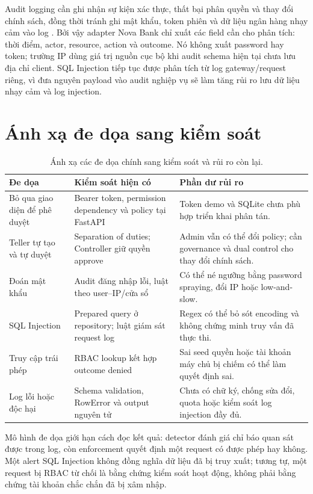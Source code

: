 Audit logging cần ghi nhận sự kiện xác thực, thất bại phân quyền và thay đổi
chính sách, đồng thời tránh ghi mật khẩu, token phiên và dữ liệu ngân hàng nhạy
cảm vào log \citep{OWASPLogging}. Bởi vậy adapter Nova Bank chỉ xuất các field
cần cho phân tích: thời điểm, actor, resource, action và outcome. Nó không xuất
password hay token; trường IP dùng giá trị nguồn cục bộ khi audit schema hiện
tại chưa lưu địa chỉ client. SQL Injection tiếp tục được phân tích từ log
gateway/request riêng, vì đưa nguyên payload vào audit nghiệp vụ sẽ làm tăng
rủi ro lưu dữ liệu nhạy cảm và log injection.

\section{Ánh xạ đe dọa sang kiểm soát}

\begin{table}[htbp]
\centering
\small
\begin{tabularx}{\textwidth}{p{}p{}X}
\toprule
Đe dọa & Kiểm soát hiện có & Phần dư rủi ro \\
\midrule
Bỏ qua giao diện để phê duyệt & Bearer token, permission dependency và policy tại FastAPI & Token demo và SQLite chưa phù hợp triển khai phân tán. \\
Teller tự tạo và tự duyệt & Separation of duties; Controller giữ quyền approve & Admin vẫn có thể đổi policy; cần governance và dual control cho thay đổi chính sách. \\
Đoán mật khẩu & Audit đăng nhập lỗi, luật theo user--IP/cửa sổ & Có thể né ngưỡng bằng password spraying, đổi IP hoặc low-and-slow. \\
SQL Injection & Prepared query ở repository; luật giám sát request log & Regex có thể bỏ sót encoding và không chứng minh truy vấn đã thực thi. \\
Truy cập trái phép & RBAC lookup kết hợp outcome denied & Sai seed quyền hoặc tài khoản máy chủ bị chiếm có thể làm quyết định sai. \\
Log lỗi hoặc độc hại & Schema validation, RowError và output nguyên tử & Chưa có chữ ký, chống sửa đổi, quota hoặc kiểm soát log injection đầy đủ. \\
\bottomrule
\end{tabularx}
\caption{Ánh xạ các đe dọa chính sang kiểm soát và rủi ro còn lại.}
\label{tab:threat-controls}
\end{table}

Mô hình đe dọa giới hạn cách đọc kết quả: detector đánh giá chỉ báo quan sát
được trong log, còn enforcement quyết định một request có được phép hay không.
Một alert SQL Injection không đồng nghĩa dữ liệu đã bị truy xuất; tương tự,
một request bị RBAC từ chối là bằng chứng kiểm soát hoạt động, không phải bằng
chứng tài khoản chắc chắn đã bị xâm nhập.

